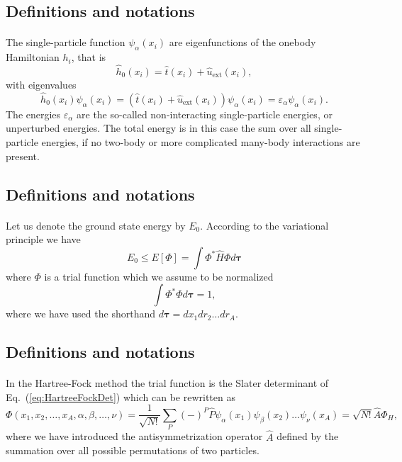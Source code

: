 \documentclass[%
twoside,                 %
final,                   %
10pt]{article}
\begin{document}
\subsection{Definitions and notations}

\paragraph{}
The single-particle function $\psi_{\alpha}(x_i)$  are eigenfunctions of the onebody
Hamiltonian $h_i$, that is
\[
\hat{h}_0(x_i)=\hat{t}(x_i) + \hat{u}_{\mathrm{ext}}(x_i),
\]
with eigenvalues 
\[
\hat{h}_0(x_i) \psi_{\alpha}(x_i)=\left(\hat{t}(x_i) + \hat{u}_{\mathrm{ext}}(x_i)\right)\psi_{\alpha}(x_i)=\varepsilon_{\alpha}\psi_{\alpha}(x_i).
\]
The energies $\varepsilon_{\alpha}$ are the so-called non-interacting single-particle energies, or unperturbed energies. 
The total energy is in this case the sum over all  single-particle energies, if no two-body or more complicated
many-body interactions are present.



\subsection{Definitions and notations}

\paragraph{}
Let us denote the ground state energy by $E_0$. According to the
variational principle we have
\[
  E_0 \le E[\Phi] = \int \Phi^*\hat{H}\Phi d\mathbf{\tau}
\]
where $\Phi$ is a trial function which we assume to be normalized
\[
  \int \Phi^*\Phi d\mathbf{\tau} = 1,
\]
where we have used the shorthand $d\mathbf{\tau}=dx_1dr_2\dots dr_A$.



\subsection{Definitions and notations}

\paragraph{}
In the Hartree-Fock method the trial function is the Slater
determinant of Eq.~(\ref{eq:HartreeFockDet}) which can be rewritten as 
\[
  \Phi(x_1,x_2,\dots,x_A,\alpha,\beta,\dots,\nu) = \frac{1}{\sqrt{N!}}\sum_{P} (-)^P\hat{P}\psi_{\alpha}(x_1)
    \psi_{\beta}(x_2)\dots\psi_{\nu}(x_A)=\sqrt{N!}\hat{A}\Phi_H,
\]
where we have introduced the antisymmetrization operator $\hat{A}$ defined by the 
summation over all possible permutations of two particles.
\end{document}
